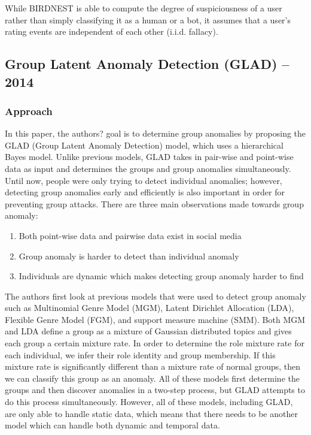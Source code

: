 \documentclass[11pt, oneside]{article}   	%
\begin{document}
\quad While BIRDNEST is able to compute the degree of suspiciousness of a user rather than simply classifying it as a human or a bot, it assumes that a user's rating events are independent of each other (i.i.d. fallacy).

\subsection*{Group Latent Anomaly Detection (GLAD) -- 2014}

\subsubsection*{Approach}

\quad In this paper, the authors? goal is to determine group anomalies by proposing the GLAD (Group Latent Anomaly Detection) model, which uses a hierarchical Bayes model.
Unlike previous models, GLAD takes in pair-wise and point-wise data as input and determines the groups and group anomalies simultaneously.
Until now, people were only trying to detect individual anomalies; however, detecting group anomalies early and efficiently is also important in order for preventing group attacks.
There are three main observations made towards group anomaly:
\begin{enumerate}
	\item Both point-wise data and pairwise data exist in social media
	\item Group anomaly is harder to detect than individual anomaly
	\item Individuals are dynamic which makes detecting group anomaly harder to find
\end{enumerate}

\quad The authors first look at previous models that were used to detect group anomaly such as Multinomial Genre Model (MGM), Latent Dirichlet Allocation (LDA), Flexible Genre Model (FGM), and support measure machine (SMM).
Both MGM and LDA define a group as a mixture of Gaussian distributed topics and gives each group a certain mixture rate.
In order to determine the role mixture rate for each individual, we infer their role identity and group membership.
If this mixture rate is significantly different than a mixture rate of normal groups, then we can classify this group as an anomaly.
All of these models first determine the groups and then discover anomalies in a two-step process, but GLAD attempts to do this process simultaneously.
However, all of these models, including GLAD, are only able to handle static data, which means that there needs to be another model which can handle both dynamic and temporal data.
\end{document}
